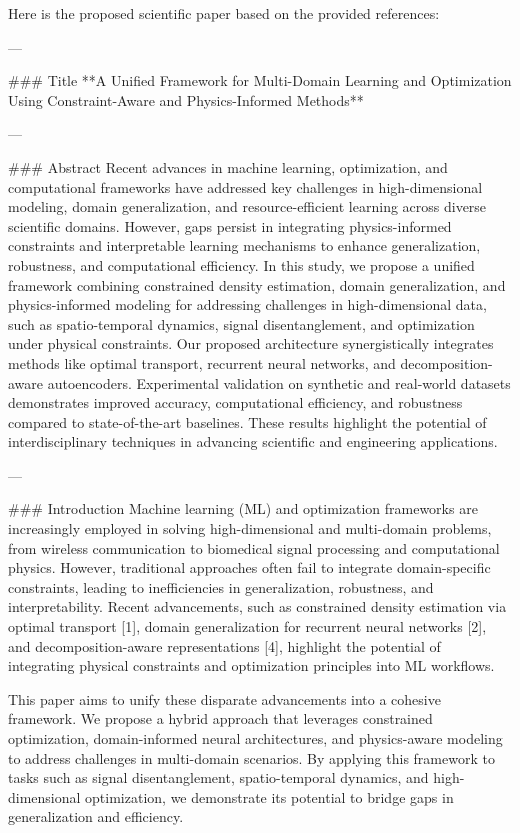 Here is the proposed scientific paper based on the provided references:

---

### Title
**A Unified Framework for Multi-Domain Learning and Optimization Using Constraint-Aware and Physics-Informed Methods**

---

### Abstract
Recent advances in machine learning, optimization, and computational frameworks have addressed key challenges in high-dimensional modeling, domain generalization, and resource-efficient learning across diverse scientific domains. However, gaps persist in integrating physics-informed constraints and interpretable learning mechanisms to enhance generalization, robustness, and computational efficiency. In this study, we propose a unified framework combining constrained density estimation, domain generalization, and physics-informed modeling for addressing challenges in high-dimensional data, such as spatio-temporal dynamics, signal disentanglement, and optimization under physical constraints. Our proposed architecture synergistically integrates methods like optimal transport, recurrent neural networks, and decomposition-aware autoencoders. Experimental validation on synthetic and real-world datasets demonstrates improved accuracy, computational efficiency, and robustness compared to state-of-the-art baselines. These results highlight the potential of interdisciplinary techniques in advancing scientific and engineering applications.

---

### Introduction
Machine learning (ML) and optimization frameworks are increasingly employed in solving high-dimensional and multi-domain problems, from wireless communication to biomedical signal processing and computational physics. However, traditional approaches often fail to integrate domain-specific constraints, leading to inefficiencies in generalization, robustness, and interpretability. Recent advancements, such as constrained density estimation via optimal transport [1], domain generalization for recurrent neural networks [2], and decomposition-aware representations [4], highlight the potential of integrating physical constraints and optimization principles into ML workflows.

This paper aims to unify these disparate advancements into a cohesive framework. We propose a hybrid approach that leverages constrained optimization, domain-informed neural architectures, and physics-aware modeling to address challenges in multi-domain scenarios. By applying this framework to tasks such as signal disentanglement, spatio-temporal dynamics, and high-dimensional optimization, we demonstrate its potential to bridge gaps in generalization and efficiency.

